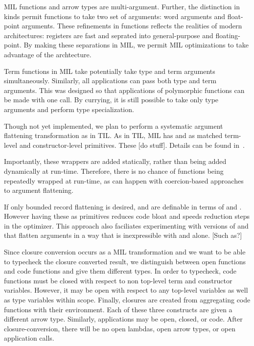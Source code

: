 \documentclass[twoside]{article}
\begin{document}
MIL functions and arrow types are multi-argument.  Further, the
distinction in kinds permit functions to take two set of arguments:
word arguments and float-point arguments.  These refinements in
functions reflects the realities of modern architectures: registers are
fast and seprated into general-purpose and floating-point.  By making
these separations in MIL, we permit MIL optimizations to take
advantage of the archtecture.

Term functions in MIL take potentially take type and term arguments
simultaneously.  Similarly, all applications can pass both type and
term arguments.  This was designed so that applications of polymorphic
functions can be made with one call.  By currying, it is still
possible to take only type arguments and perform type specialization.

Though not yet implemented, we plan to perform a systematic argument
flattening transformation as in TIL.  As in TIL, MIL has  and
 as matched term-level and constructor-level primitives.  
These [do stuff].  Details can be found in~\cite{???}.

Importantly, these wrappers are added statically, rather than being
added dynamically at run-time.  Therefore, there is no chance of
functions being repeatedly wrapped at run-time, as can happen with
coercion-based approaches to argument flattening.

If only bounded record flattening is desired,  and
 are definable in terms of  and .
However having these as primitives reduces code bloat and speeds
reduction steps in the optimizer.  This approach also faciliates
experimenting with versions of  and  that
flatten arguments in a way that is inexpressible with
 and  alone.  [Such as?]

Since closure conversion occurs as a MIL transformation and we want to
be able to typecheck the closure converted result, we distinguish
between open functions and code functions and give them different
types.  In order to typecheck, code functions must be closed with
respect to non top-level term and constructor variables.  However, it
may be open with respect to any top-level variables as well as type
variables within scope.  Finally, closures are created from
aggregating code functions with their environment.  Each of these
three constructs are given a different arrow type.  Similarly,
applications may be open, closed, or code.  After closure-conversion,
there will be no open lambdas, open arrow types, or open application
calls.
\end{document}
